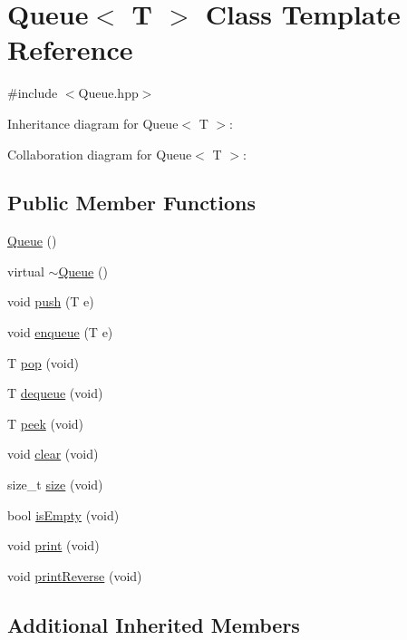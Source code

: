 \hypertarget{class_queue}{}\section{Queue$<$ T $>$ Class Template Reference}
\label{class_queue}


{\ttfamily \#include $<$Queue.\+hpp$>$}



Inheritance diagram for Queue$<$ T $>$\+:


Collaboration diagram for Queue$<$ T $>$\+:
\subsection*{Public Member Functions}
\begin{DoxyCompactItemize}
\item 
\hyperlink{class_queue_af73bb29c868f7b37f369c668f114bd9f}{Queue} ()
\item 
virtual \hyperlink{class_queue_aa7eef1b427e24555780505de20e9acbc}{$\sim$\+Queue} ()
\item 
void \hyperlink{class_queue_a87fb1068ba6e87e3be225cfbd3c4778f}{push} (T e)
\item 
void \hyperlink{class_queue_a2b0d8e8d8cacf789bff0b4db73bf249b}{enqueue} (T e)
\item 
T \hyperlink{class_queue_a2398b345833a6953f46d9103a987f86c}{pop} (void)
\item 
T \hyperlink{class_queue_a0ea4eebce27fa776990577276d68ee62}{dequeue} (void)
\item 
T \hyperlink{class_queue_a25c55852d37e76803d3890067df243cc}{peek} (void)
\item 
void \hyperlink{class_queue_ae1371a83e78df0c50fca4654e1e5c224}{clear} (void)
\item 
size\+\_\+t \hyperlink{class_queue_ae8744e96ba805136b01a96f9ac93f982}{size} (void)
\item 
bool \hyperlink{class_queue_af68a849aebf3a15e6a5559c8f2a0740d}{is\+Empty} (void)
\item 
void \hyperlink{class_queue_a7a7d0ab94a0123eab32ee1ad4f85cf2b}{print} (void)
\item 
void \hyperlink{class_queue_a79283a677e816b81b690d39dc4b648a1}{print\+Reverse} (void)
\end{DoxyCompactItemize}
\subsection*{Additional Inherited Members}


